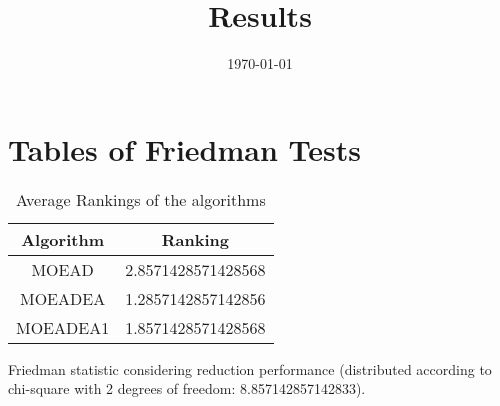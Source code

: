 \documentclass{article}
\title{Results}
\author{}
\date{\today}
\begin{document}
\oddsidemargin 0in \topmargin 0in\maketitle
\section{Tables of Friedman Tests}
\begin{table}[!htp]
\centering
\caption{Average Rankings of the algorithms
}\begin{tabular}{c|c}
Algorithm&Ranking\\
\hline
MOEAD&2.8571428571428568\\
MOEADEA&1.2857142857142856\\
MOEADEA1&1.8571428571428568\\
\end{tabular}
\end{table}


Friedman statistic considering reduction performance (distributed according to chi-square with 2 degrees of freedom: 8.857142857142833).
\end{document}

